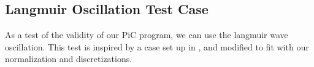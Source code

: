 \subsection{Langmuir Oscillation Test Case}
As a test of the validity of our PiC program, we can use the langmuir wave
oscillation. This test is inspired by a case set up in \citet{birdsall_plasma_2004},
and modified to fit with our normalization and discretizations.
